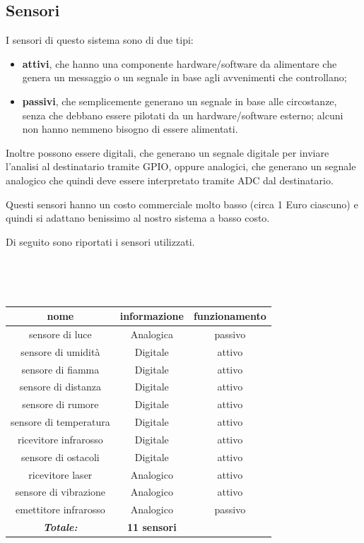 \documentclass[a4paper,titlepage]{book}
\begin{document}
\subsection{Sensori}

I sensori di questo sistema sono di due tipi:

\begin{itemize}[noitemsep,topsep=10pt,parsep=23pt,partopsep=0pt]

\item \textbf{attivi}, che hanno una componente hardware/software da alimentare che genera un messaggio o un segnale in base agli avvenimenti che controllano;

\item \textbf{passivi}, che semplicemente generano un segnale in base alle circostanze, senza che debbano essere pilotati da un hardware/software esterno; alcuni non hanno nemmeno bisogno di essere alimentati.

\end{itemize}  

Inoltre possono essere digitali, che generano un segnale digitale per inviare l'analisi al destinatario tramite GPIO, oppure analogici, che generano un segnale analogico che quindi deve essere interpretato tramite ADC dal destinatario.

Questi sensori hanno un costo commerciale molto basso (circa 1 Euro ciascuno) e quindi si adattano benissimo al nostro sistema a basso costo.


Di seguito sono riportati i sensori utilizzati.

~

~


\begin{tabular}{|c  c  c|}
\hline
\multicolumn{1}{|c|}{\textbf {nome}} & \multicolumn{1}{|c|}{\textbf {informazione}} & \multicolumn{1}{c|}{\textbf {funzionamento}} \\
\hline

sensore di luce			& Analogica	& passivo \\
sensore di umidità 		& Digitale	& attivo  \\
sensore di fiamma		& Digitale	& attivo \\
sensore di distanza		& Digitale	& attivo \\
sensore di rumore		& Digitale	& attivo \\
sensore di temperatura		& Digitale	& attivo \\
ricevitore infrarosso		& Digitale	& attivo \\
sensore di ostacoli		& Digitale	& attivo \\
ricevitore laser		& Analogico	& attivo \\
sensore di vibrazione		& Analogico	& attivo \\
emettitore infrarosso		& Analogico	& passivo \\

\hline

\textit{\textbf{Totale:}}	& \textbf{11 sensori} & \\

\hline
\end{tabular}
\end{document}
